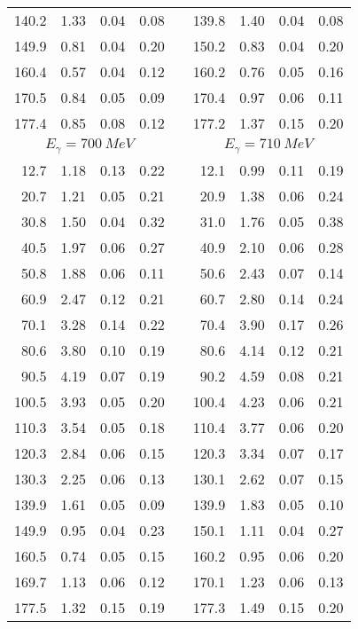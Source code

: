 \begin{table}[htbp]
\begin{center}
\begin{tabular}{|r|r|c|c|l|r|r|c|c|}
140.2 &  1.33 &  0.04 &  0.08 & & 139.8 &  1.40 &  0.04 &  0.08 \\ 
149.9 &  0.81 &  0.04 &  0.20 & & 150.2 &  0.83 &  0.04 &  0.20 \\ 
160.4 &  0.57 &  0.04 &  0.12 & & 160.2 &  0.76 &  0.05 &  0.16 \\ 
170.5 &  0.84 &  0.05 &  0.09 & & 170.4 &  0.97 &  0.06 &  0.11 \\ 
177.4 &  0.85 &  0.08 &  0.12 & & 177.2 &  1.37 &  0.15 &  0.20 \\ 
\hline 
\hline 
\multicolumn{4}{|c|}{ $E_{\gamma}=700~MeV$} & & 
\multicolumn{4}{c|}{ $E_{\gamma}=710~MeV$} \\ 
\cline{1-4} 
\cline{6-9} 
 12.7 &  1.18 &  0.13 &  0.22 & &  12.1 &  0.99 &  0.11 &  0.19 \\ 
 20.7 &  1.21 &  0.05 &  0.21 & &  20.9 &  1.38 &  0.06 &  0.24 \\ 
 30.8 &  1.50 &  0.04 &  0.32 & &  31.0 &  1.76 &  0.05 &  0.38 \\ 
 40.5 &  1.97 &  0.06 &  0.27 & &  40.9 &  2.10 &  0.06 &  0.28 \\ 
 50.8 &  1.88 &  0.06 &  0.11 & &  50.6 &  2.43 &  0.07 &  0.14 \\ 
 60.9 &  2.47 &  0.12 &  0.21 & &  60.7 &  2.80 &  0.14 &  0.24 \\ 
 70.1 &  3.28 &  0.14 &  0.22 & &  70.4 &  3.90 &  0.17 &  0.26 \\ 
 80.6 &  3.80 &  0.10 &  0.19 & &  80.6 &  4.14 &  0.12 &  0.21 \\ 
 90.5 &  4.19 &  0.07 &  0.19 & &  90.2 &  4.59 &  0.08 &  0.21 \\ 
100.5 &  3.93 &  0.05 &  0.20 & & 100.4 &  4.23 &  0.06 &  0.21 \\ 
110.3 &  3.54 &  0.05 &  0.18 & & 110.4 &  3.77 &  0.06 &  0.20 \\ 
120.3 &  2.84 &  0.06 &  0.15 & & 120.3 &  3.34 &  0.07 &  0.17 \\ 
130.3 &  2.25 &  0.06 &  0.13 & & 130.1 &  2.62 &  0.07 &  0.15 \\ 
139.9 &  1.61 &  0.05 &  0.09 & & 139.9 &  1.83 &  0.05 &  0.10 \\ 
149.9 &  0.95 &  0.04 &  0.23 & & 150.1 &  1.11 &  0.04 &  0.27 \\ 
160.5 &  0.74 &  0.05 &  0.15 & & 160.2 &  0.95 &  0.06 &  0.20 \\ 
169.7 &  1.13 &  0.06 &  0.12 & & 170.1 &  1.23 &  0.06 &  0.13 \\ 
177.5 &  1.32 &  0.15 &  0.19 & & 177.3 &  1.49 &  0.15 &  0.20 \\ 
\cline{1-4} 
\cline{6-9} 
\end{tabular} 

\end{center} 
\end{table}
